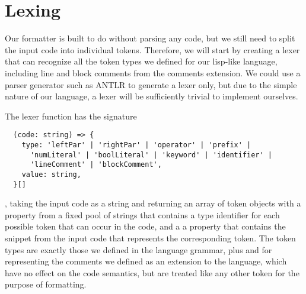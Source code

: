 \section{Lexing}
Our formatter is built to do without parsing any code,
but we still need to split the input code into individual tokens.
Therefore, we will start by creating a lexer that can recognize
all the token types we defined for our lisp-like language,
including line and block comments from the comments extension.
We could use a parser generator such as ANTLR to generate a lexer only,
but due to the simple nature of our language,
a lexer will be sufficiently trivial to implement ourselves.

The lexer function has the signature
\begin{verbatim}
  (code: string) => {
    type: 'leftPar' | 'rightPar' | 'operator' | 'prefix' |
      'numLiteral' | 'boolLiteral' | 'keyword' | 'identifier' |
      'lineComment' | 'blockComment',
    value: string,
  }[]
\end{verbatim}
, taking the input code as a string and returning an array of
token objects with a property  from a fixed pool of
strings that contains a type identifier
for each possible token that can occur in the code,
and a a property  that contains the
snippet from the input code that represents the corresponding token.
The token types are exactly those we defined in the language grammar,
plus  and 
for representing the comments we defined as an extension to the language,
which have no effect on the code semantics,
but are treated like any other token for the purpose of formatting.



















